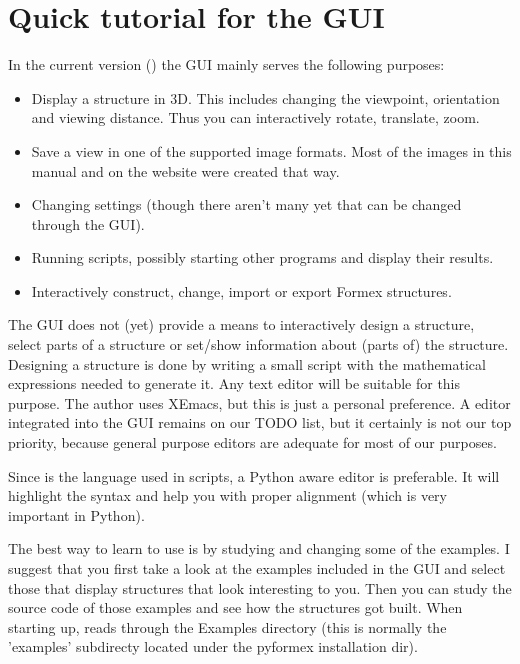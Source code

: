 \section{Quick tutorial for the \pyformex GUI}
\label{sec:gui-tutorial}
In the current version () the GUI mainly serves the following purposes:
\begin{itemize}
\item Display a structure in 3D. This includes changing the viewpoint, orientation and viewing distance. Thus you can interactively rotate, translate, zoom.
\item Save a view in one of the supported image formats. Most of the images in this manual and on the \pyformex{} website were created that way. 
\item Changing \pyformex settings (though there aren't many yet that can be changed through the GUI).
\item Running \pyformex scripts, possibly starting other programs and display their results.
\item Interactively construct, change, import or export Formex structures. 
\end{itemize}

The GUI does not (yet) provide a means to interactively design a structure, select parts of a structure or set/show information about (parts of) the structure. Designing a structure is done by writing a small script with the mathematical expressions needed to generate it. Any text editor will be suitable for this purpose. The author uses XEmacs, but this is just a personal preference. 
A \pyformex editor integrated into the GUI remains on our TODO list, but it certainly is not our top priority, because general purpose editors are adequate for most of our purposes. 

Since  is the language used in \pyformex scripts, a Python aware editor is preferable. It will highlight the syntax and help you with proper alignment (which is very important in Python). 
 

The best way to learn to use \pyformex is by studying and changing some of the examples. I suggest that you first take a look at the examples included in the \pyformex GUI and select those that display structures that look interesting to you. Then you can study the source code of those examples and see how the structures got built. 
When starting up, \pyformex reads through the Examples directory (this is normally the 'examples' subdirecty located under the pyformex installation dir).  


